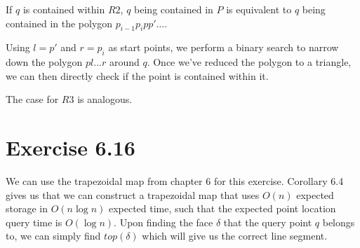 \documentclass[11pt,a4paper]{article}
\begin{document}
If $q$ is contained within $R2$, $q$ being contained in $P$ is equivalent to
$q$ being contained in the polygon $p_{i-1} p_i p p' \ldots$.

Using $l = p'$ and $r = p_i$ as start points, we perform a binary search to
narrow down the polygon $p l \ldots r$ around $q$. Once we've reduced the
polygon to a triangle, we can then directly check if the point is contained
within it.

The case for $R3$ is analogous.


\section{Exercise 6.16}

We can use the trapezoidal map from chapter 6 for this
exercise. Corollary 6.4 gives us that we can construct a trapezoidal
map that uses $O(n)$ expected storage in $O(n \log n)$ expected time,
such that the expected point location query time is $O(\log n)$. Upon
finding the face $\delta$ that the query point $q$ belongs to, we can
simply find $top(\delta)$ which will give us the correct line segment.
\end{document}
